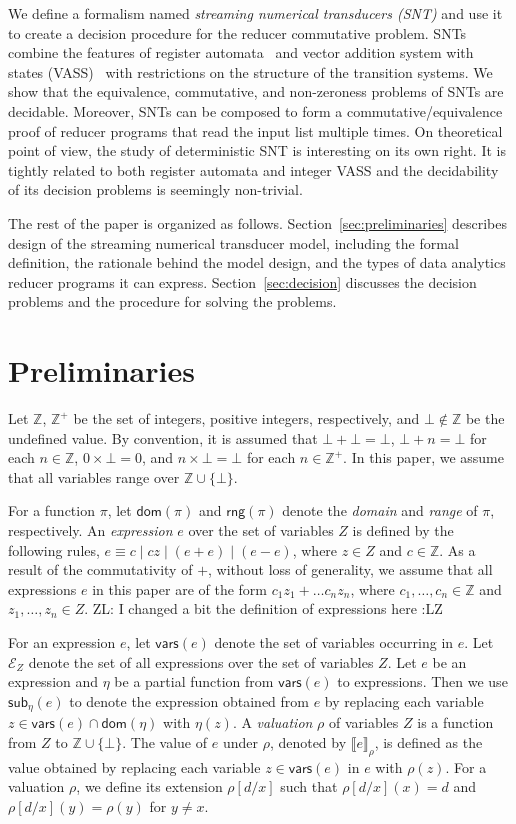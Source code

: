 \documentclass[runningheads,a4paper]{llncs}
\def\Ee{{\mathcal{E} }}
\newcommand\intnum{{\mathbb{Z} }}
\newcommand\vars{\mathsf{vars}}
\newcommand\dom{\mathsf{dom}}
\newcommand\rng{\mathsf{rng}}
\newcommand{\sub}[2]{\mathsf{sub}_{#2}(#1)}
\newcommand{\eval}[2]{\llbracket#1\rrbracket_{#2}}
\newcommand{\zhilin}[1]{\color{cyan} {ZL: #1 :LZ} \color{black}}
\begin{document}
We define a formalism named \emph{streaming numerical transducers (SNT)} and use it to create a decision procedure for the reducer commutative problem.
SNTs combine the features of register automata~\cite{XX} and vector addition system with states (VASS)~\cite{YY} with restrictions on the structure of the transition systems.
We show that the equivalence, commutative, and non-zeroness problems of SNTs are decidable.
Moreover, SNTs can be composed to form a commutative/equivalence proof of reducer programs that read the input list multiple times.
On theoretical point of view, the study of deterministic SNT is
interesting on its own right. It is tightly related to both register automata and integer VASS and the decidability of its decision problems is seemingly non-trivial. 

The rest of the paper is organized as follows. Section~\ref{sec:preliminaries} describes design of the streaming numerical transducer model, including the formal definition, the rationale behind the model design, and the types of data analytics reducer programs it can express. Section~\ref{sec:decision} discusses the decision problems and the procedure for solving the problems.

\section{Preliminaries}
%
Let $\intnum$,  $\intnum^+$ be the set of integers, positive integers, respectively, and $\bot \not \in \intnum$ be 
the undefined value. By convention, it is assumed that $\bot + \bot = \bot$, $\bot + n = \bot$ for each $n \in \intnum$, $0 \times \bot = 0$, and $n \times \bot = \bot$ for each $n \in \intnum^+$.
In this paper, we assume that all variables range over $\intnum \cup \{\bot\}$.  

For a function $\pi$, let $\dom(\pi)$ and $\rng(\pi)$ denote the \emph{domain}  and \emph{range} of $\pi$, respectively. 
An \emph{expression} $e$ over the set of variables $Z$ is defined by the following rules, $e\equiv  c \mid  c z \mid (e + e) \mid (e - e)$, where $z \in Z$ and $c\in \intnum$.  As a result of the commutativity of $+$, without loss of generality, we assume that all expressions $e$ in this paper are of the form $c_1 z_1 + \dots c_n z_n$, where $c_1,\dots,c_n \in \intnum$ and $z_1,\dots,z_n \in Z$. \zhilin{I changed a bit the definition of expressions here}

For an expression $e$, let $\vars(e)$ denote the set of variables occurring in $e$. Let $\Ee_Z$ denote the set of all expressions over the set of variables $Z$. Let $e$ be an expression and $\eta$ be a partial function from $\vars(e)$ to expressions. Then we use $\sub{e}{\eta}$ to denote the expression obtained from $e$ by replacing each variable $z \in \vars(e)\cap\dom(\eta)$ with $\eta(z)$. A \emph{valuation} $\rho$ of variables $Z$ is a function from $Z$ to $\intnum \cup \{\bot\}$. The value of $e$ under $\rho$, denoted by $\eval{e}{\rho}$, is defined as the value obtained by replacing each variable $z \in \vars(e)$ in $e$ with $\rho(z)$.
For a valuation $\rho$, we define its extension $\rho[d/x]$ such that $\rho[d/x](x)=d$ and $\rho[d/x](y)=\rho(y)$ for $y\neq x$.
\end{document}
